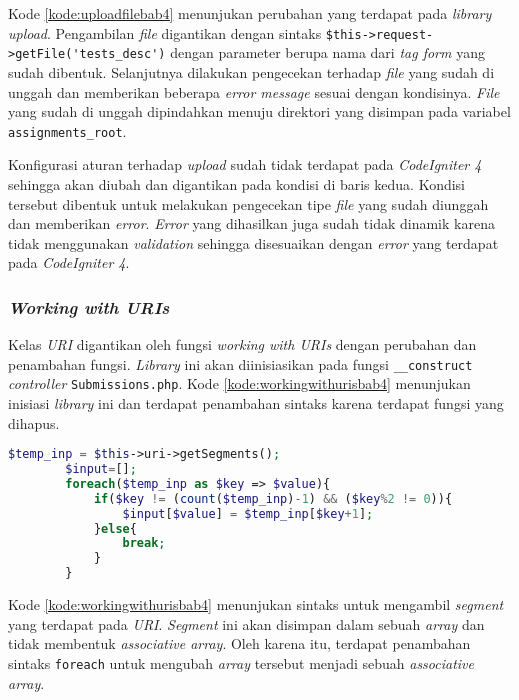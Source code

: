 Kode \ref{kode:uploadfilebab4} menunjukan perubahan yang terdapat pada \textit{library upload}. Pengambilan \textit{file} digantikan dengan sintaks \verb|$this->request->getFile('tests_desc')| dengan parameter berupa nama dari \textit{tag form} yang sudah dibentuk. Selanjutnya dilakukan pengecekan terhadap \textit{file} yang sudah di unggah dan memberikan beberapa \textit{error message} sesuai dengan kondisinya. \textit{File} yang sudah di unggah dipindahkan menuju direktori yang disimpan pada variabel \texttt{assignments\_root}. 

Konfigurasi aturan terhadap \textit{upload} sudah tidak terdapat pada \textit{CodeIgniter 4} sehingga akan diubah dan digantikan pada kondisi di baris kedua. Kondisi tersebut dibentuk untuk melakukan pengecekan tipe \textit{file} yang sudah diunggah dan memberikan \textit{error}. \textit{Error} yang dihasilkan juga sudah tidak dinamik karena tidak menggunakan \textit{validation} sehingga disesuaikan dengan \textit{error} yang terdapat pada \textit{CodeIgniter 4}.

\subsubsection{\textit{Working with URIs}}
Kelas \textit{URI} digantikan oleh fungsi \textit{working with URIs} dengan perubahan dan penambahan fungsi. \textit{Library} ini akan diinisiasikan pada fungsi \texttt{\_\_construct} \textit{controller} \texttt{Submissions.php}. Kode \ref{kode:workingwithurisbab4} menunjukan inisiasi \textit{library} ini dan terdapat penambahan sintaks karena terdapat fungsi yang dihapus.

\begin{lstlisting}[language=PHP, caption=Perancangan inisiasi dan penambahan sintaks \textit{library URIs} pada \texttt{\_\_construct}, label=kode:workingwithurisbab4]
$temp_inp = $this->uri->getSegments();
		$input=[];
		foreach($temp_inp as $key => $value){
			if($key != (count($temp_inp)-1) && ($key%2 != 0)){
				$input[$value] = $temp_inp[$key+1];	
			}else{
				break;
			}
		}
\end{lstlisting}
Kode \ref{kode:workingwithurisbab4} menunjukan sintaks untuk mengambil \textit{segment} yang terdapat pada \textit{URI}. \textit{Segment} ini akan disimpan dalam sebuah \textit{array} dan tidak membentuk \textit{associative array}. Oleh karena itu, terdapat penambahan sintaks \texttt{foreach} untuk mengubah \textit{array} tersebut menjadi sebuah \textit{associative array}.

